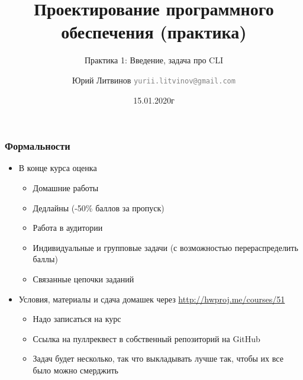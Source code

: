 \documentclass[xetex,mathserif,serif]{beamer}
\title{Проектирование программного обеспечения (практика)}
\subtitle{Практика 1: Введение, задача про CLI}
\author[Юрий Литвинов]{Юрий Литвинов \newline \textcolor{gray}{\small\texttt{yurii.litvinov@gmail.com}}}
\date{15.01.2020г}
\begin{document}
	
	\frame{\titlepage}
	
	\begin{frame}
		\frametitle{Формальности}
		\begin{itemize}
			\item В конце курса оценка
			\begin{itemize}
				\item Домашние работы
				\item Дедлайны (-50\% баллов за пропуск)
				\item Работа в аудитории
				\item Индивидуальные и групповые задачи (с возможностью перераспределить баллы)
				\item Связанные цепочки заданий
			\end{itemize}
			\item Условия, материалы и сдача домашек через \url{http://hwproj.me/courses/51}
			\begin{itemize}
				\item Надо записаться на курс
			\end{itemize}
			\begin{itemize}
				\item Ссылка на пуллреквест в собственный репозиторий на GitHub
				\item Задач будет несколько, так что выкладывать лучше так, чтобы их все было можно смерджить
			\end{itemize}
		\end{itemize}
	\end{frame}
\end{document}
